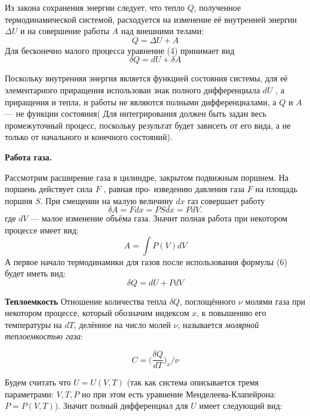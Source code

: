 \documentclass[12pt]{article}
\begin{document}
    Из закона сохранения энергии следует, что тепло $Q$, полученное термодинамической системой, расходуется на изменение её внутренней энергии $\Delta U$ и на совершение работы $A$ над внешними телами:
    \begin{equation}
        Q = \Delta U + A
    \end{equation}
    Для бесконечно малого процесса уравнение (4) принимает вид 
    \begin{equation}
        \delta Q = dU + \delta A
    \end{equation}

    Поскольку внутренняя энергия является функцией состояния системы, для её элементарного приращения использован знак полного дифференциала $dU$ , а приращения и тепла, и работы не являются полными дифференциалами, а $Q$ и $A$ — не функции состояния(
    Для интегрирования должен быть задан весь промежуточный процесс, поскольку результат будет зависеть от его вида, а не только от начального и конечного состояний).

    \textbf{ Работа газа.}

    Рассмотрим расширение газа в цилиндре, закрытом подвижным поршнем. На поршень действует сила $F$ , равная про- изведению давления газа $F$ на площадь поршня $S$. При смещении на малую величину $dx$ газ совершает работу
    \begin{equation}
        \delta A = F dx = P S dx = P dV.
    \end{equation}
    где $dV$  — малое изменение объёма газа.
    Значит полная работа при некотором процессе имеет вид:
    \begin{equation}
        A = \int P(V) dV
    \end{equation}
    А первое начало термодинамики для газов после использования формулы (6) будет иметь вид:
    \begin{equation}
        \delta Q = dU + P dV
    \end{equation}

    \textbf{Теплоемкость}
    Отношение количества тепла $\delta Q$, поглощённого $\nu$ молями газа при некотором процессе, который обозначим индексом $x$, к повышению его температуры на $dT$, делённое на число молей $\nu$, называется \textit{молярной теплоемкостью газа}:

    \begin{equation}
        C = \bigg(\frac{\delta Q}{dT}\bigg)_x / \nu
    \end{equation}

    Будем считать что $U = U(V,T)$ (так как система описывается тремя параметрами: $V,T,P$ но при этом есть уравнение Менделеева-Клапейрона: $P = P(V,T)$).
    Значит полный дифференциал для $U$ имеет следующий вид:
\end{document}
